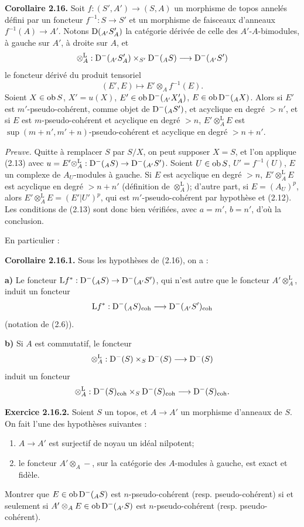 \documentclass[11pt]{article}
\begin{document}
\textbf{Corollaire 2.16.} Soit \(f:(S',A')\to(S,A)\) un morphisme de topos annelés défini par un foncteur \(f^{-1}:S\to S'\) et un morphisme de faisceaux d'anneaux \(f^{-1}(A)\to A'\). Notons \(\mathrm D(_{A'}S'_A)\) la catégorie dérivée de celle des \(A'\)-\(A\)-bimodules, à gauche sur \(A'\), à droite sur \(A\), et
\[
  \otimes_A^{\mathrm L}:\mathrm D^-(_{A'}S'_A)\times_{S'}\mathrm D^-(_A S)
  \longrightarrow \mathrm D^-(_{A'}S')
\]
le foncteur dérivé du produit tensoriel
\[
  (E',E)\longmapsto E'\otimes_A f^{-1}(E).
\]
Soient \(X\in\operatorname{ob} S\), \(X'=u(X)\), \(E'\in\operatorname{ob}\mathrm D^-(_{A'}X'_A)\), \(E\in\operatorname{ob}\mathrm D^-(_A X)\). Alors si \(E'\) est \(m'\)-pseudo-cohérent, comme objet de \(\mathrm D^-(_A S')\), et acyclique en degré \(>n'\), et si \(E\) est \(m\)-pseudo-cohérent et acyclique en degré \(>n\), \(E'\otimes_A^{\mathrm L}E\) est \(\sup(m+n',m'+n)\)-pseudo-cohérent et acyclique en degré \(>n+n'\).

\emph{Preuve.} Quitte à remplacer \(S\) par \(S/X\), on peut supposer \(X=S\), et l'on applique (2.13) avec \(u=E'\otimes_A^{\mathrm L}:\mathrm D^-(_A S)\to\mathrm D^-(_{A'}S')\). Soient \(U\in\operatorname{ob} S\), \(U'=f^{-1}(U)\), \(E\) un complexe de \(A_U\)-modules à gauche. Si \(E\) est acyclique en degré \(>n\), \(E'\otimes_A^{\mathrm L}E\) est acyclique en degré \(>n+n'\) (définition de \(\otimes_A^{\mathrm L}\)); d'autre part, si \(E=(A_U)^p\), alors \(E'\otimes_A^{\mathrm L}E=(E'|U')^p\), qui est \(m'\)-pseudo-cohérent par hypothèse et (2.12). Les conditions de (2.13) sont donc bien vérifiées, avec \(a=m'\), \(b=n'\), d'où la conclusion.

En particulier :

\textbf{Corollaire 2.16.1.} Sous les hypothèses de (2.16), on a :

\textbf{a)} Le foncteur \(\mathrm Lf^*: \mathrm D^-(_A S)\to \mathrm D^-(_{A'}S')\), qui n'est autre que le foncteur \(A'\otimes_A^{\mathrm L}\), induit un foncteur
\[
  \mathrm Lf^*: \mathrm D^-(_A S)_{\operatorname{coh}}\longrightarrow \mathrm D^-(_{A'}S')_{\operatorname{coh}}
\]
(notation de (2.6)).

\textbf{b)} Si \(A\) est commutatif, le foncteur
\[
  \otimes_A^{\mathrm L}:\mathrm D^-(S)\times_S\mathrm D^-(S)
  \longrightarrow \mathrm D^-(S)
\]
induit un foncteur
\[
  \otimes_A^{\mathrm L}:\mathrm D^-(S)_{\operatorname{coh}}\times_S\mathrm D^-(S)_{\operatorname{coh}}
  \longrightarrow \mathrm D^-(S)_{\operatorname{coh}} .
\]

\textbf{Exercice 2.16.2.} Soient \(S\) un topos, et \(A\to A'\) un morphisme d'anneaux de \(S\). On fait l'une des hypothèses suivantes :
\begin{enumerate}[label=(\roman*)]
\item \(A\to A'\) est surjectif de noyau un idéal nilpotent;
\item le foncteur \(A'\otimes_A-\), sur la catégorie des \(A\)-modules à gauche, est exact et fidèle.
\end{enumerate}
Montrer que \(E\in\operatorname{ob}\mathrm D^-(_A S)\) est \(n\)-pseudo-cohérent (resp. pseudo-cohérent) si et seulement si \(A'\otimes_A E\in\operatorname{ob}\mathrm D^-(_{A'}S)\) est \(n\)-pseudo-cohérent (resp. pseudo-cohérent).
\end{document}
